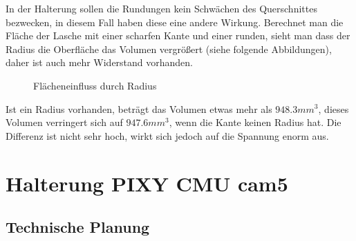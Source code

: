	In der Halterung sollen die Rundungen kein Schwächen des Querschnittes bezwecken, in diesem Fall haben diese eine andere Wirkung.
	Berechnet man die Fläche der Lasche mit einer scharfen Kante und einer runden,
	sieht man dass der Radius die Oberfläche \bzw das Volumen vergrößert (siehe folgende Abbildungen), daher ist auch mehr Widerstand vorhanden.

			\begin{figure}[H]
				\begin{centering}
				\caption{Flächeneinfluss durch Radius}
				\par\end{centering}
				\label{klammer_radius}
			\end{figure}

	Ist ein Radius vorhanden, beträgt das Volumen etwas mehr als $948.3 mm^{3}$, dieses Volumen verringert sich auf $947.6 mm^{3}$, wenn die Kante keinen Radius hat. Die Differenz ist nicht sehr hoch, wirkt sich jedoch auf die Spannung enorm aus.

			\newpage

\section{Halterung PIXY CMU cam5}

	\subsection{Technische Planung}

